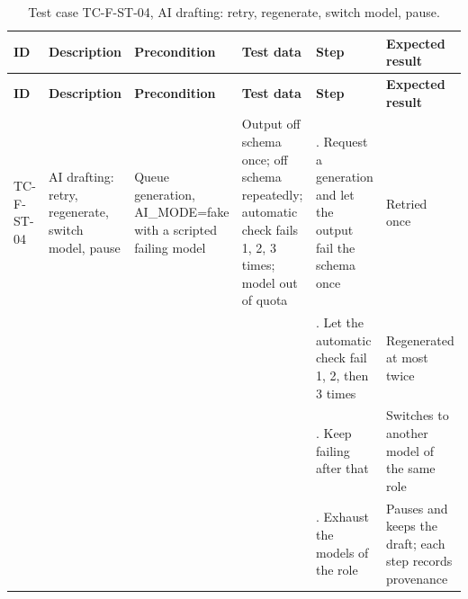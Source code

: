 {\footnotesize{}\renewcommand{\arraystretch}{1.1}
\begin{longtable}{|>{\raggedright\arraybackslash}p{}|>{\raggedright\arraybackslash}p{}|>{\raggedright\arraybackslash}p{}|>{\raggedright\arraybackslash}p{}|>{\raggedright\arraybackslash}p{}|>{\raggedright\arraybackslash}p{}|}
\caption{Test case TC-F-ST-04, AI drafting: retry, regenerate, switch model, pause.} \\
\hline
\textbf{ID} & \textbf{Description} & \textbf{Precondition} & \textbf{Test data} & \textbf{Step} & \textbf{Expected result} \\ \hline
\endfirsthead
\hline
\textbf{ID} & \textbf{Description} & \textbf{Precondition} & \textbf{Test data} & \textbf{Step} & \textbf{Expected result} \\ \hline
\endhead
TC-F-ST-04 & AI drafting: retry, regenerate, switch model, pause & Queue generation, AI\_\allowbreak{}MODE=fake with a scripted failing model & Output off schema once; off schema repeatedly; automatic check fails 1, 2, 3 times; model out of quota & 1. Request a generation and let the output fail the schema once & Retried once \\ \cline{5-6}
 &  &  &  & 2. Let the automatic check fail 1, 2, then 3 times & Regenerated at most twice \\ \cline{5-6}
 &  &  &  & 3. Keep failing after that & Switches to another model of the same role \\ \cline{5-6}
 &  &  &  & 4. Exhaust the models of the role & Pauses and keeps the draft; each step records provenance \\ \hline
\end{longtable}
}

